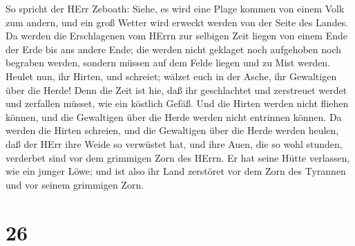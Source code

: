  So spricht der HErr Zeboath: Siehe, es wird eine Plage
kommen von einem Volk zum andern, und ein groß Wetter wird erweckt
werden von der Seite des Landes.  Da werden die
Erschlagenen vom HErrn zur selbigen Zeit liegen von einem Ende der Erde
bis ans andere Ende; die werden nicht geklaget noch aufgehoben noch
begraben werden, sondern müssen auf dem Felde liegen und zu Mist werden.
 Heulet nun, ihr Hirten, und schreiet; wälzet euch in der
Asche, ihr Gewaltigen über die Herde! Denn die Zeit ist hie, daß ihr
geschlachtet und zerstreuet werdet und zerfallen müsset, wie ein
köstlich Gefäß.  Und die Hirten werden nicht fliehen
können, und die Gewaltigen über die Herde werden nicht entrinnen können.
 Da werden die Hirten schreien, und die Gewaltigen über die
Herde werden heulen, daß der HErr ihre Weide so verwüstet hat,
 und ihre Auen, die so wohl stunden, verderbet sind vor dem
grimmigen Zorn des HErrn.  Er hat seine Hütte verlassen,
wie ein junger Löwe; und ist also ihr Land zerstöret vor dem Zorn des
Tyrannen und vor seinem grimmigen Zorn.

\hypertarget{section-25}{%
\section{26}\label{section-25}}


